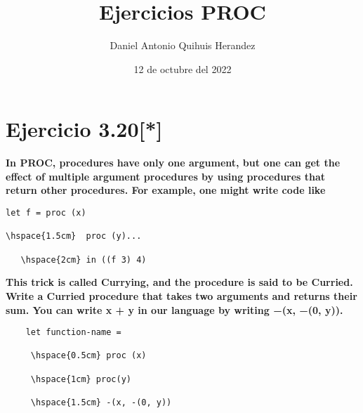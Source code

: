\documentclass{article}
\title{Ejercicios PROC}
\author{Daniel Antonio Quihuis Herandez }
\date{12 de octubre del 2022}
\begin{document}
\maketitle

\section{Ejercicio 3.20[*]}
\textbf{In PROC, procedures have only one argument, but one can get the
effect of multiple argument procedures by using procedures that return other procedures. For example, one might write code like}


\begin{lstlisting}
let f = proc (x)

\hspace{1.5cm}  proc (y)...

   \hspace{2cm} in ((f 3) 4)
\end{lstlisting}

\textbf{This trick is called Currying, and the procedure is said to be Curried. Write a Curried
procedure that takes two arguments and returns their sum. You can write x + y in our language by writing −(x, −(0, y)).}

\begin{lstlisting}
    let function-name = 
    
     \hspace{0.5cm} proc (x) 
     
     \hspace{1cm} proc(y) 
     
     \hspace{1.5cm} -(x, -(0, y))
    
\end{lstlisting}
\end{document}
